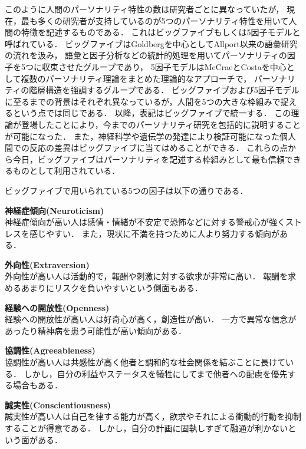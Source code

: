 このように人間のパーソナリティ特性の数は研究者ごとに異なっていたが，
現在，最も多くの研究者が支持しているのが5つのパーソナリティ特性を用いて人間の特徴を記述するものである．
これはビッグファイブもしくは5因子モデルと呼ばれている．
ビッグファイブはGoldberg\cite{goldberg-1981, goldberg-1990, goldberg-1992}を中心としてAllport以来の語彙研究の流れを汲み，
語彙と因子分析などの統計的処理を用いてパーソナリティの因子を5つに収束させたグループであり，
5因子モデルはMcCraeとCosta\cite{mccrae-1987, mccrae-1992}を中心として複数のパーソナリティ理論をまとめた理論的なアプローチで，
パーソナリティの階層構造を強調するグループである\cite{first-personality, tipij}．
ビッグファイブおよび5因子モデルに至るまでの背景はそれぞれ異なっているが，人間を5つの大きな枠組みで捉えるという点では同じである．
以降，表記はビッグファイブで統一する．
この理論が登場したことにより，今までのパーソナリティ研究を包括的に説明することが可能になった．
また，神経科学や遺伝学の発達により検証可能になった個人間での反応の差異はビッグファイブに当てはめることができる．
これらの点から今日，ビッグファイブはパーソナリティを記述する枠組みとして最も信頼できるものとして利用されている．

ビッグファイブで用いられている5つの因子は以下の通りである．
\begin{description}
    \item{\textbf{神経症傾向(Neuroticism)}}\mbox{}\\
    神経症傾向が高い人は感情・情緒が不安定で恐怖などに対する警戒心が強くストレスを感じやすい．
    また，現状に不満を持つために人より努力する傾向がある．
    \item{\textbf{外向性(Extraversion)}}\mbox{}\\
    外向性が高い人は活動的で，報酬や刺激に対する欲求が非常に高い．
    報酬を求めるあまりにリスクを負いやすいという側面もある．
    \item{\textbf{経験への開放性(Openness)}}\mbox{}\\
    経験への開放性が高い人は好奇心が高く，創造性が高い．
    一方で異常な信念があったり精神病を患う可能性が高い傾向がある．
    \item{\textbf{協調性(Agreeableness)}}\mbox{}\\
    協調性が高い人は共感性が高く他者と調和的な社会関係を結ぶことに長けている．
    しかし，自分の利益やステータスを犠牲にしてまで他者への配慮を優先する場合もある．
    \item{\textbf{誠実性(Conscientiousness)}}\mbox{}\\
    誠実性が高い人は自己を律する能力が高く，欲求やそれによる衝動的行動を抑制することが得意である．
    しかし，自分の計画に固執しすぎて融通が利かないという面がある．
\end{description}

